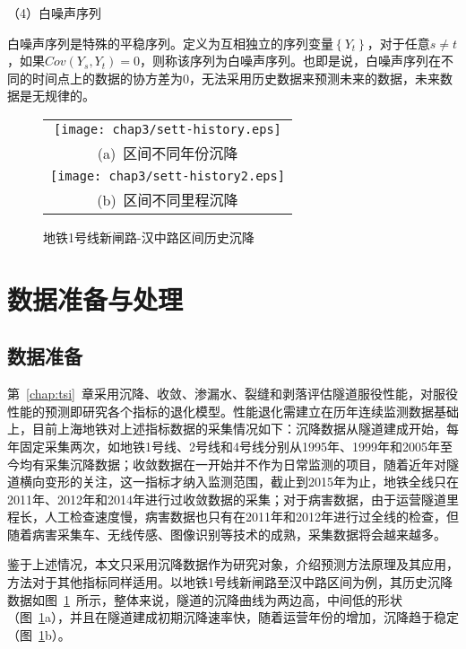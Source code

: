 （4）白噪声序列

白噪声序列是特殊的平稳序列。定义为互相独立的序列变量$\left\{ {{Y}_{t}} \right\}$，对于任意$s\ne t$，如果$Cov({{Y}_{s}},{{Y}_{t}})=0$，则称该序列为白噪声序列。也即是说，白噪声序列在不同的时间点上的数据的协方差为0，无法采用历史数据来预测未来的数据，未来数据是无规律的。

\begin{figure}[htb!] 
    \centering 
    \begin{tabular}{c} 
        \texttt{[image: chap3/sett-history.eps]} \\ 
        (a)~区间不同年份沉降 \\
        \texttt{[image: chap3/sett-history2.eps]} \\ 
        (b)~区间不同里程沉降 \\
    \end{tabular}
    \caption{地铁1号线新闸路-汉中路区间历史沉降} 
    \label{fig:地铁1号线新闸路-汉中路区间历史沉降} 
\end{figure}

\section{数据准备与处理}

\subsection{数据准备}

第~\ref{chap:tsi}~章采用沉降、收敛、渗漏水、裂缝和剥落评估隧道服役性能，对服役性能的预测即研究各个指标的退化模型。性能退化需建立在历年连续监测数据基础上，目前上海地铁对上述指标数据的采集情况如下：沉降数据从隧道建成开始，每年固定采集两次，如地铁1号线、2号线和4号线分别从1995年、1999年和2005年至今均有采集沉降数据；收敛数据在一开始并不作为日常监测的项目，随着近年对隧道横向变形的关注，这一指标才纳入监测范围，截止到2015年为止，地铁全线只在2011年、2012年和2014年进行过收敛数据的采集；对于病害数据，由于运营隧道里程长，人工检查速度慢，病害数据也只有在2011年和2012年进行过全线的检查，但随着病害采集车、无线传感、图像识别等技术的成熟，采集数据将会越来越多。

鉴于上述情况，本文只采用沉降数据作为研究对象，介绍预测方法原理及其应用，方法对于其他指标同样适用。以地铁1号线新闸路至汉中路区间为例，其历史沉降数据如图~\ref{fig:地铁1号线新闸路-汉中路区间历史沉降}~所示，整体来说，隧道的沉降曲线为两边高，中间低的形状（图~\ref{fig:地铁1号线新闸路-汉中路区间历史沉降}a），并且在隧道建成初期沉降速率快，随着运营年份的增加，沉降趋于稳定（图~\ref{fig:地铁1号线新闸路-汉中路区间历史沉降}b）。


